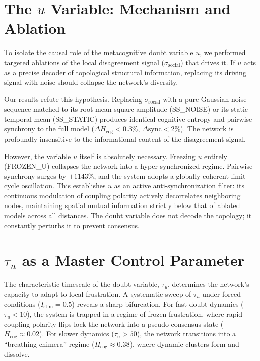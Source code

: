 \documentclass[11pt,a4paper]{article}
\begin{document}
\section{The $u$ Variable: Mechanism and Ablation}
\label{sec:mechanism}
To isolate the causal role of the metacognitive doubt variable $u$, we performed targeted ablations of the local disagreement signal ($\sigma_{\mathrm{social}}$) that drives it. If $u$ acts as a precise decoder of topological structural information, replacing its driving signal with noise should collapse the network's diversity. 

Our results refute this hypothesis. Replacing $\sigma_{\mathrm{social}}$ with a pure Gaussian noise sequence matched to its root-mean-square amplitude (\textsc{SS\_NOISE}) or its static temporal mean (\textsc{SS\_STATIC}) produces identical cognitive entropy and pairwise synchrony to the full model ($\Delta H_{\mathrm{cog}} < 0.3\%$, $\Delta\mathrm{sync} < 2\%$). The network is profoundly insensitive to the informational content of the disagreement signal. 

However, the variable $u$ itself is absolutely necessary. Freezing $u$ entirely (\textsc{FROZEN\_U}) collapses the network into a hyper-synchronized regime. Pairwise synchrony surges by $+1143\%$, and the system adopts a globally coherent limit-cycle oscillation. This establishes $u$ as an active anti-synchronization filter: its continuous modulation of coupling polarity actively decorrelates neighboring nodes, maintaining spatial mutual information strictly below that of ablated models across all distances. The doubt variable does not decode the topology; it constantly perturbs it to prevent consensus.

\section{$\tau_u$ as a Master Control Parameter}
\label{sec:bifurcation}
The characteristic timescale of the doubt variable, $\tau_u$, determines the network's capacity to adapt to local frustration. A systematic sweep of $\tau_u$ under forced conditions ($I_{\mathrm{stim}}=0.5$) reveals a sharp bifurcation. For fast doubt dynamics ($\tau_u < 10$), the system is trapped in a regime of frozen frustration, where rapid coupling polarity flips lock the network into a pseudo-consensus state ($H_{\mathrm{cog}} \approx 0.02$). For slower dynamics ($\tau_u > 50$), the network transitions into a ``breathing chimera'' regime ($H_{\mathrm{cog}} \approx 0.38$), where dynamic clusters form and dissolve.
\end{document}
